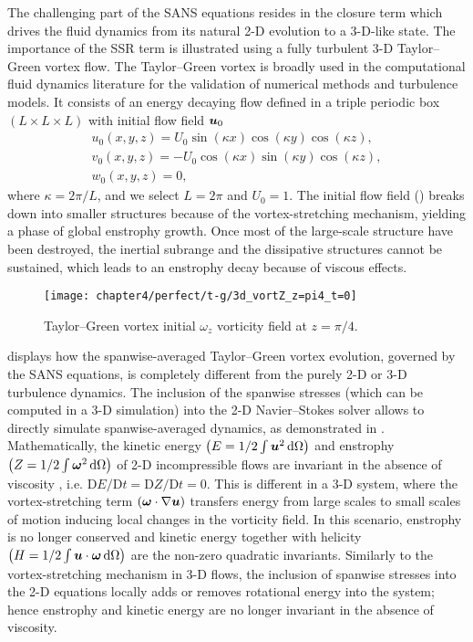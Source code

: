 \documentclass[../main.tex]{subfiles}
\begin{document}
The challenging part of the SANS equations resides in the closure term which drives the fluid dynamics from its natural 2-D evolution to a 3-D-like state.
The importance of the SSR term is illustrated using a fully turbulent 3-D Taylor--Green vortex flow.
The Taylor--Green vortex \citep{Taylor1937} is broadly used in the computational fluid dynamics literature for the validation of numerical methods and turbulence models.
It consists of an energy decaying flow defined in a triple periodic box $(L\times L\times L)$ with initial flow field $\boldsymbol{u}_0$
\begin{gather}
u_0(x,y,z) = U_0\sin(\kappa x)\cos(\kappa y)\cos(\kappa z), \nonumber \\
v_0(x,y,z) = -U_0\cos(\kappa x)\sin(\kappa y)\cos(\kappa z), \nonumber \\
w_0(x,y,z) = 0,
\end{gather}
where $\kappa=2\pi/L$, and we select $L=2\pi$ and $U_0=1$.
The initial flow field () breaks down into smaller structures because of the vortex-stretching mechanism, yielding a phase of global enstrophy growth.
Once most of the large-scale structure have been destroyed, the inertial subrange and the dissipative structures cannot be sustained, which leads to an enstrophy decay because of viscous effects.

\begin{figure}[t]
\centering
\texttt{[image: chapter4/perfect/t-g/3d\_vortZ\_z=pi4\_t=0]}
\caption{Taylor--Green vortex initial $\omega_z$ vorticity field at $z=\pi/4$.}
\label{fig:t-g_0}
\end{figure}

 displays how the spanwise-averaged Taylor--Green vortex evolution, governed by the SANS equations, is completely different from the purely 2-D or 3-D turbulence dynamics.
The inclusion of the spanwise stresses (which can be computed in a 3-D simulation) into the 2-D Navier--Stokes solver allows to directly simulate spanwise-averaged dynamics, as demonstrated in .
Mathematically, the kinetic energy $\left(E=1/2\int \boldsymbol{u}^2\,\mathrm{d}\Omega \right)$ and enstrophy $\left(Z=1/2\int \boldsymbol{\omega}^2\,\mathrm{d}\Omega \right)$ of 2-D incompressible flows are invariant in the absence of viscosity \citep{Kraichnan1967}, i.e. $\mathrm{D}E/\mathrm{D}t=\mathrm{D}Z/\mathrm{D}t=0$.
This is different in a 3-D system, where the vortex-stretching term $\left(\boldsymbol\omega\cdot\nabla\boldsymbol{u} \right)$ transfers energy from large scales to small scales of motion inducing local changes in the vorticity field.
In this scenario, enstrophy is no longer conserved and kinetic energy together with helicity $\left(H=1/2\int \boldsymbol{u}\cdot\boldsymbol{\omega}\,\mathrm{d}\Omega \right)$ are the non-zero quadratic invariants.
Similarly to the vortex-stretching mechanism in 3-D flows, the inclusion of spanwise stresses into the 2-D equations locally adds or removes rotational energy into the system; hence enstrophy and kinetic energy are no longer invariant in the absence of viscosity.
\end{document}
